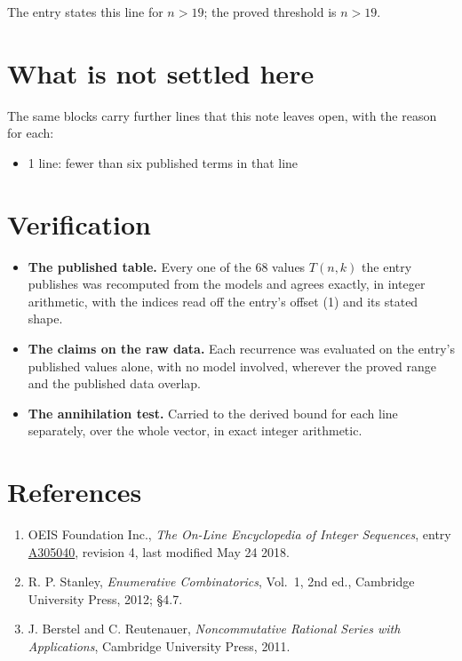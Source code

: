 \documentclass[11pt]{article}
\theoremstyle{definition}
\begin{document}
The entry states this line for $n > 19$; the proved threshold is $n > 19$.

\section{What is not settled here}

The same blocks carry further lines that this note leaves open, with the reason for each:

\begin{itemize}

\item 1 line: fewer than six published terms in that line

\end{itemize}

\section{Verification}

\begin{itemize}

\item {\bfseries The published table.} Every one of the 68 values $T(n,k)$ the entry publishes was recomputed from the models and agrees exactly, in integer arithmetic, with the indices read off the entry's offset (1) and its stated shape.

\item {\bfseries The claims on the raw data.} Each recurrence was evaluated on the entry's published values alone, with no model involved, wherever the proved range and the published data overlap.

\item {\bfseries The annihilation test.} Carried to the derived bound for each line separately, over the whole vector, in exact integer arithmetic.

\end{itemize}

\section{References}

\begin{enumerate}

\item OEIS Foundation Inc., \emph{The On-Line Encyclopedia of Integer Sequences}, entry \href{https://oeis.org/A305040}{A305040}, revision 4, last modified May 24 2018.

\item R. P. Stanley, \emph{Enumerative Combinatorics}, Vol.~1, 2nd ed., Cambridge University Press, 2012; \S4.7.

\item J. Berstel and C. Reutenauer, \emph{Noncommutative Rational Series with Applications}, Cambridge University Press, 2011.

\end{enumerate}
\end{document}
